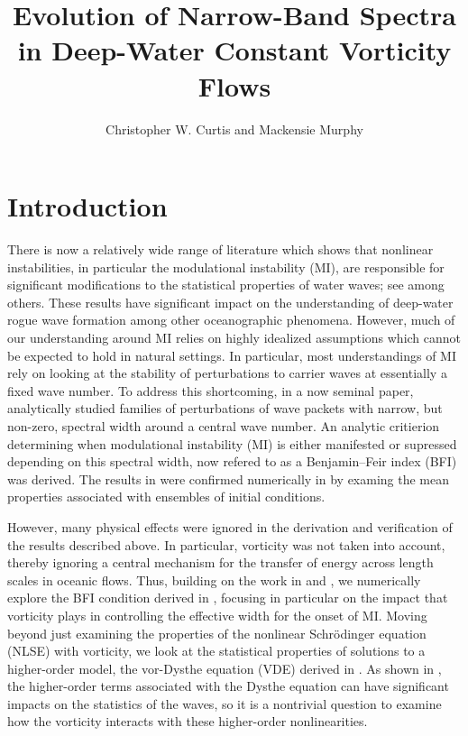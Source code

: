 \documentclass[a4paper,11pt]{article}
\title{Evolution of Narrow-Band Spectra in Deep-Water Constant Vorticity Flows}
\author{Christopher W. Curtis and Mackensie Murphy}
\date{}
\begin{document}
\maketitle
\section*{Introduction}
There is now a relatively wide range of literature which shows that nonlinear instabilities, in particular the modulational instability (MI), are responsible for significant modifications to the statistical properties of water waves; see \cite{dysthe2,dysthe3,onorato,thomas2012nonlinear} among others.   These results have significant impact on the understanding of deep-water rogue wave formation among other oceanographic phenomena.  However, much of our understanding around MI relies on highly idealized assumptions which cannot be expected to hold in natural settings.  In particular, most understandings of MI rely on looking at the stability of perturbations to carrier waves at essentially a fixed wave number.  To address this shortcoming, in a now seminal paper, \cite{alber} analytically studied families of perturbations of wave packets with narrow, but non-zero, spectral width around a central wave number.  An analytic critierion determining when modulational instability (MI) is either manifested or supressed depending on this spectral width, now refered to as a Benjamin--Feir index (BFI) was derived.  The results in \cite{alber} were confirmed numerically in \cite{dysthe2,dysthe3} by examing the mean properties associated with ensembles of initial conditions.  

However, many physical effects were ignored in the derivation and verification of the results described above. In particular, vorticity was not taken into account, thereby ignoring a central mechanism for the transfer of energy across length scales in oceanic flows.  Thus, building on the work in \cite{thomas2012nonlinear} and \cite{curtis8}, we numerically explore the BFI condition derived in \cite{alber}, focusing in particular on the impact that vorticity plays in controlling the effective width for the onset of MI.  Moving beyond just examining the properties of the nonlinear Schr\"{o}dinger equation (NLSE) with vorticity, we look at the statistical properties of solutions to a higher-order model, the vor-Dysthe equation (VDE) derived in \cite{curtis8}.  As shown in \cite{onorato}, the higher-order terms associated with the Dysthe equation can have significant impacts on the statistics of the waves, so it is a nontrivial question to examine how the vorticity interacts with these higher-order nonlinearities.  
\end{document}
